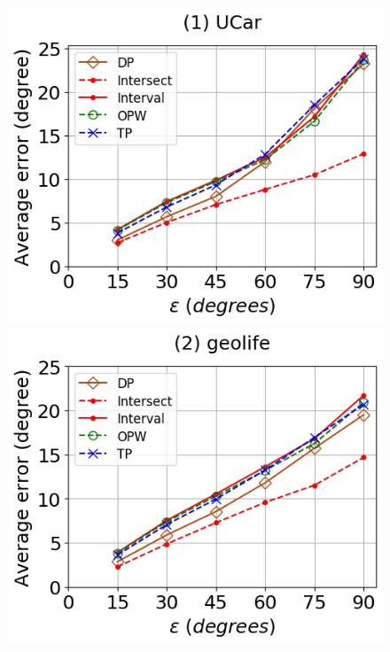\begin{figure}[tb!]
	\centering
	\includegraphics[scale=0.348]{Figures/Exp-DAD-error-epsilon-service.jpg}	\hspace{0.5ex}
	\includegraphics[scale=0.348]{Figures/Exp-DAD-error-epsilon-geolife.jpg}	\hspace{0.5ex}

\end{figure}
